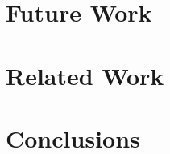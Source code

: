 \documentclass[conference]{acm_proc_article-sp}
\begin{document}
%

\section{Future Work}
%

\section{Related Work}
%

\section{Conclusions}
%



\end{document}
